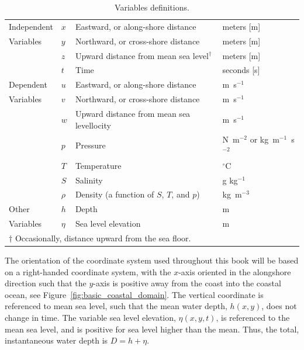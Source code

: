 \documentclass[11pt]{report}
\numberwithin{equation}{section}
\begin{document}
\begin{table}[htb]
\caption{Variables definitions.}
\label{tab:vars} 
\begin{center}
\begin{tabular}{ l l l l} 
\hline\hline
Independent           & $x$ &   Eastward, or along-shore distance           & meters [m] \\
Variables             & $y$ &   Northward, or cross-shore distance          & meters [m] \\
                      & $z$ &   Upward distance from mean sea level${}^\dagger$ & meters [m] \\
                      & $t$ &   Time                                        & seconds [s] \\
\hline
Dependent            & $u$  &   Eastward, or along-shore distance           & m~s$^{-1}$ \\
Variables            & $v$  &   Northward, or cross-shore distance          & m~s$^{-1}$ \\
                     & $w$  &   Upward distance from mean sea levellocity   & m~s$^{-1}$ \\
                     & $p$  &   Pressure                        & N~m$^{-2}$ or kg~m$^{-1}$~s$^{-2}$\\
                     & $T$  &   Temperature                                 & $^\circ$C \\
                     & $S$  &   Salinity                                    & g kg$^{-1}$ \\
                     & $\rho$ & Density (a function of $S$, $T$, and $p$)   & kg~m$^{-3}$ \\                 
\hline
Other                & $h$  &   Depth                                       & m \\
Variables            & $\eta$ &  Sea level elevation                        & m \\
\hline
\multicolumn{4}{l}{\footnotesize{$\dagger$ Occasionally, distance upward from the sea floor.}}\\
\end{tabular} 
\end{center}
\end{table}

The orientation of the coordinate system used throughout this book will be based on a right-handed coordinate system, with the $x$-axis oriented in the alongshore direction such that the $y$-axis is positive away from the coast into the coastal ocean, see Figure~\ref{fig:basic_coastal_domain}.  The vertical coordinate is referenced to mean sea level, such that the mean water depth, $h(x, y)$, does not change in time.  The variable sea level elevation, $\eta(x, y, t)$, is referenced to the mean sea level, and is positive for sea level higher than the mean.  Thus, the total, instantaneous water depth is $D=h+\eta$.
\end{document}
